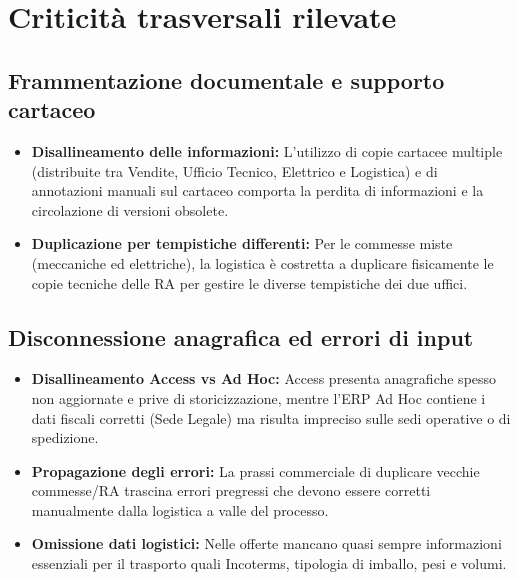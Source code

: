 \section{Criticità trasversali rilevate}

\subsection{Frammentazione documentale e supporto cartaceo}
\begin{itemize}
      \item \textbf{Disallineamento delle informazioni:} L'utilizzo di copie cartacee multiple (distribuite tra Vendite,
            Ufficio Tecnico, Elettrico e Logistica) e di annotazioni manuali sul cartaceo comporta la perdita di informazioni e
            la circolazione di versioni obsolete.
      \item \textbf{Duplicazione per tempistiche differenti:} Per le commesse miste (meccaniche ed elettriche),
            la logistica è costretta a duplicare fisicamente le copie tecniche delle \ac{RA} per gestire le diverse
            tempistiche dei due uffici.
\end{itemize}

\subsection{Disconnessione anagrafica ed errori di input}
\begin{itemize}
      \item \textbf{Disallineamento Access vs Ad Hoc:} Access presenta anagrafiche spesso non aggiornate e prive
            di storicizzazione, mentre l'ERP Ad Hoc contiene i dati fiscali corretti (Sede Legale) ma risulta
            impreciso sulle sedi operative o di spedizione.
      \item \textbf{Propagazione degli errori:} La prassi commerciale di duplicare vecchie commesse/RA trascina errori
            pregressi che devono essere corretti manualmente dalla logistica a valle del processo.
      \item \textbf{Omissione dati logistici:} Nelle offerte mancano quasi sempre informazioni essenziali per il
            trasporto quali Incoterms, tipologia di imballo, pesi e volumi.
\end{itemize}

